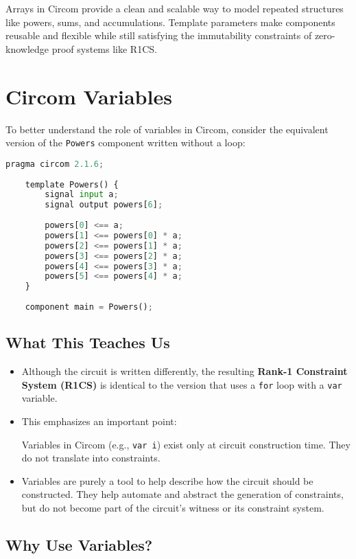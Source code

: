 \documentclass{article}
\begin{document}
Arrays in Circom provide a clean and scalable way to model repeated structures like powers, sums, and accumulations. Template parameters make components reusable and flexible while still satisfying the immutability constraints of zero-knowledge proof systems like R1CS.
\section*{Circom Variables}

To better understand the role of variables in Circom, consider the equivalent version of the \texttt{Powers} component written without a loop:

\begin{lstlisting}[language=python, caption={Unrolled version without variables}]
	pragma circom 2.1.6;
	
	template Powers() {
		signal input a;
		signal output powers[6];
		
		powers[0] <== a;
		powers[1] <== powers[0] * a;
		powers[2] <== powers[1] * a;
		powers[3] <== powers[2] * a;
		powers[4] <== powers[3] * a;
		powers[5] <== powers[4] * a;
	}
	
	component main = Powers();
\end{lstlisting}

\subsection*{What This Teaches Us}

\begin{itemize}
	\item Although the circuit is written differently, the resulting \textbf{Rank-1 Constraint System (R1CS)} is identical to the version that uses a \texttt{for} loop with a \texttt{var} variable.
	\item This emphasizes an important point: 
	\begin{tcolorbox}[colback=gray!5, colframe=black!50, title=Key Insight]
		Variables in Circom (e.g., \texttt{var i}) exist only at circuit construction time. They do not translate into constraints.
	\end{tcolorbox}
	\item Variables are purely a tool to help describe how the circuit should be constructed. They help automate and abstract the generation of constraints, but do not become part of the circuit's witness or its constraint system.
\end{itemize}

\subsection*{Why Use Variables?}
\end{document}
